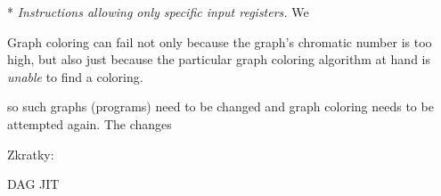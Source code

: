 \begitems
* {\em Instructions allowing only specific input registers.} We 
\enditems

Graph coloring can fail not only because the graph's chromatic number is too
high, but also just because the particular graph coloring algorithm at hand is
{\em unable} to find a coloring.

so such
graphs (programs) need to be changed and graph coloring needs to be attempted
again. The changes






Zkratky:

DAG
JIT
